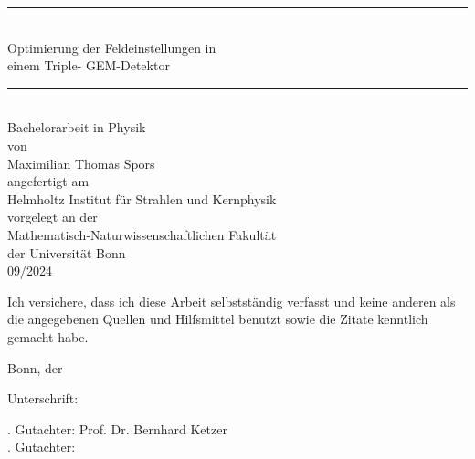 \documentclass[fontsize=10.5, ngerman]{scrreport}
\begin{document}
	
	\begin{titlepage}
		\centering
		\vspace*{\fill}
		\begin{center}
			\rule[0.5ex]{.8\textwidth}{2pt}\\
			\LARGE Optimierung der Feldeinstellungen in\\
			einem Triple- GEM-Detektor\\
			\rule[0.5ex]{.8\textwidth}{2pt}\\
			\vspace{0.5 cm}
			\large Bachelorarbeit in Physik\\
			\vspace{0.5 cm}
			von \\
			\vspace{0.5 cm}
			Maximilian Thomas Spors\\
			\vspace{0.5 cm}
			angefertigt am \\
			\vspace{0.5 cm}
			Helmholtz Institut für Strahlen und Kernphysik\\
			\vspace{1 cm}
			vorgelegt an der \\
			Mathematisch-Naturwissenschaftlichen Fakultät\\
			der Universität Bonn\\
			\vspace{1 cm}
			09/2024		
		\end{center}
		
		\vspace*{\fill}
	\end{titlepage}
	\newpage
	\pagestyle{empty}
	\vspace*{\fill}
	\noindent	Ich versichere, dass ich diese Arbeit selbstständig verfasst und keine anderen als die angegebenen
	Quellen und Hilfsmittel benutzt sowie die Zitate kenntlich gemacht habe.
	
	
	\vspace{1.5 cm}
	
	
	\noindent \begin{minipage}[c]{6cm}
		Bonn, der\centering \dotfill
	\end{minipage} \hfill 
	\begin{minipage}[c]{6cm}
		Unterschrift: \centering \dotfill
	\end{minipage}
	
	\vspace{2cm}
	
	. Gutachter: Prof. Dr. Bernhard Ketzer\\
	. Gutachter:
	\newpage
	\pagestyle{scrheadings}
	\tableofcontents
	\newpage
	
	
	
	\newpage
	
	\newpage
	
	\newpage
	\appendix %
	\printbibliography
	
\end{document}
